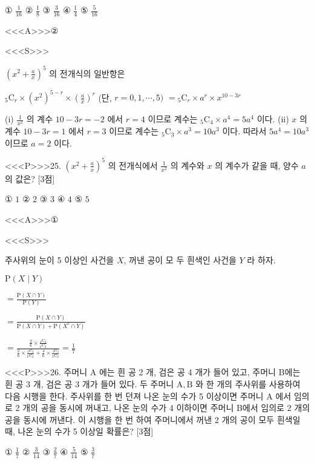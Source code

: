 \documentclass{oblivoir}
\begin{document}
① $\frac{1}{16}$
② $\frac{1}{8}$
③ $\frac{3}{16}$
④ $\frac{1}{4}$
⑤ $\frac{5}{16}$

<<<A>>>②

<<<S>>>



$\left(x^{2}+\frac{a}{x}\right)^{5}$ 의 전개식의 일반항은


${ }_{5} \mathrm{C}_{r} \times\left(x^{2}\right)^{5-r} \times\left(\frac{a}{x}\right)^{r}$ (단, $r=0,1, \cdots, 5)$
$={ }_{5} \mathrm{C}_{r} \times a^{r} \times x^{10-3 r}$


(i) $\frac{1}{x^{2}}$ 의 계수
$10-3 r=-2$ 에서 $r=4$ 이므로
계수는 ${ }_{5} \mathrm{C}_{4} \times a^{4}=5 a^{4}$ 이다.
(ii) $x$ 의 계수
$10-3 r=1$ 에서 $r=3$ 이므로
계수는 ${ }_{5} \mathrm{C}_{3} \times a^{3}=10 a^{3}$ 이다.
따라서 $5 a^{4}=10 a^{3}$ 이므로 $a=2$ 이다.


<<<P>>>25. $\left(x^{2}+\frac{a}{x}\right)^{5}$ 의 전개식에서 $\frac{1}{x^{2}}$ 의 계수와 $x$ 의 계수가 같을 때, 양수 $a$ 의 값은? [3점]

① $1$
② $2$
③ $3$
④ $4$
⑤ $5$

<<<A>>>①

<<<S>>>



주사위의 눈이 5 이상인 사건을 $X$, 꺼낸 공이 모 두 흰색인 사건을 $Y$ 라 하자.

$\mathrm{P}(X \mid Y) $

$=\frac{\mathrm{P}(X \cap Y)}{\mathrm{P}(Y)}$

$=\frac{\mathrm{P}(X \cap Y)}{\mathrm{P}(X \cap Y)+\mathrm{P}\left(X^{c} \cap Y\right)}$

$=\frac{\frac{2}{6} \times \frac{{ }_{2} \mathrm{C}_{2}}{{ }_{6} \mathrm{C}_{2}}}{\frac{2}{6} \times \frac{{ }_{2} \mathrm{C}_{2}}{{ }_{6} \mathrm{C}_{2}}+\frac{4}{6} \times \frac{{ }_{3} \mathrm{C}_{2}}{{ }_{6} \mathrm{C}_{2}}}=\frac{1}{7}$


<<<P>>>26. 주머니 $\mathrm{A}$ 에는 흰 공 2 개, 검은 공 4 개가 들어 있고, 주머니 B에는 흰 공 3 개, 검은 공 3 개가 들어 있다.
두 주머니 $\mathrm{A}, \mathrm{B}$ 와 한 개의 주사위를 사용하여 다음 시행을 한다.
주사위를 한 번 던져
나온 눈의 수가 5 이상이면
주머니 $\mathrm{A}$ 에서 임의로 2 개의 공을 동시에 꺼내고,
나온 눈의 수가 4 이하이면
주머니 B에서 임의로 2 개의 공을 동시에 꺼낸다.
이 시행을 한 번 하여 주머니에서 꺼낸 2 개의 공이 모두 흰색일 때, 나온 눈의 수가 5 이상일 확률은? [3점]

① $\frac{1}{7}$
② $\frac{3}{14}$
③ $\frac{2}{7}$
④ $\frac{5}{14}$
⑤ $\frac{3}{7}$
\end{document}
